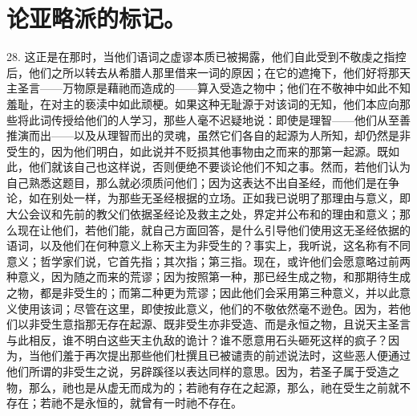 
\section{论亚略派的标记。}

28. 这正是在那时，当他们语词之虚谬本质已被揭露，他们自此受到不敬虔之指控后，他们之所以转去从希腊人那里借来一词的原因；在它的遮掩下，他们好将那天主圣言——万物原是藉祂而造成的——算入受造之物中；他们在不敬神中如此不知羞耻，在对主的亵渎中如此顽梗。如果这种无耻源于对该词的无知，他们本应向那些将此词传授给他们的人学习，那些人毫不迟疑地说：即使是理智——他们从至善推演而出——以及从理智而出的灵魂，虽然它们各自的起源为人所知，却仍然是非受生的，因为他们明白，如此说并不贬损其他事物由之而来的那第一起源。既如此，他们就该自己也这样说，否则便绝不要谈论他们不知之事。然而，若他们认为自己熟悉这题目，那么就必须质问他们；因为这表达不出自圣经，而他们是在争论，如在别处一样，为那些无圣经根据的立场。正如我已说明了那理由与意义，即大公会议和先前的教父们依据圣经论及救主之处，界定并公布和的理由和意义；那么现在让他们，若他们能，就自己方面回答，是什么引导他们使用这无圣经依据的语词，以及他们在何种意义上称天主为非受生的？事实上，我听说，这名称有不同意义；哲学家们说，它首先指；其次指；第三指。现在，或许他们会愿意略过前两种意义，因为随之而来的荒谬；因为按照第一种，那已经生成之物，和那期待生成之物，都是非受生的；而第二种更为荒谬；因此他们会采用第三种意义，并以此意义使用该词；尽管在这里，即使按此意义，他们的不敬依然毫不逊色。因为，若他们以非受生意指那无存在起源、既非受生亦非受造、而是永恒之物，且说天主圣言与此相反，谁不明白这些天主仇敌的诡计？谁不愿意用石头砸死这样的疯子？因为，当他们羞于再次提出那些他们杜撰且已被谴责的前述说法时，这些恶人便通过他们所谓的非受生之说，另辟蹊径以表达同样的意思。因为，若圣子属于受造之物，那么，祂也是从虚无而成为的；若祂有存在之起源，那么，祂在受生之前就不存在；若祂不是永恒的，就曾有一时祂不存在。\par

